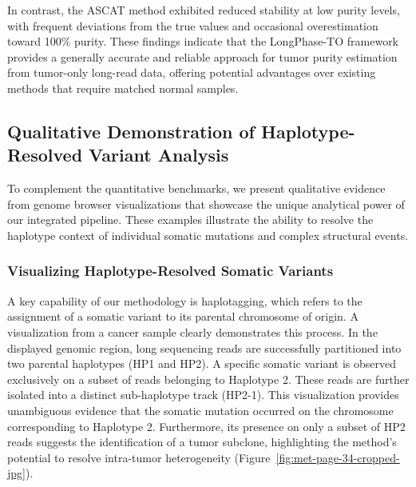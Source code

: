 \documentclass[pdflatex,sn-nature]{sn-jnl}
\begin{document}
In contrast, the ASCAT method exhibited reduced stability at low purity levels, with frequent deviations from the true values and occasional overestimation toward 100\% purity. These findings indicate that the LongPhase-TO framework provides a generally accurate and reliable approach for tumor purity estimation from tumor-only long-read data, offering potential advantages over existing methods that require matched normal samples.

\subsection{Qualitative Demonstration of Haplotype-Resolved Variant Analysis}\label{qualitative-demonstration-of-haplotype-resolved-variant-analysis}

To complement the quantitative benchmarks, we present qualitative evidence from genome browser visualizations that showcase the unique analytical power of our integrated pipeline. These examples illustrate the ability to resolve the haplotype context of individual somatic mutations and complex structural events.

\subsubsection{Visualizing Haplotype-Resolved Somatic Variants}\label{visualizing-haplotype-resolved-somatic-variants}

A key capability of our methodology is haplotagging, which refers to the assignment of a somatic variant to its parental chromosome of origin. A visualization from a cancer sample clearly demonstrates this process. In the displayed genomic region, long sequencing reads are successfully partitioned into two parental haplotypes (HP1 and HP2). A specific somatic variant is observed exclusively on a subset of reads belonging to Haplotype 2. These reads are further isolated into a distinct sub-haplotype track (HP2-1). This visualization provides unambiguous evidence that the somatic mutation occurred on the chromosome corresponding to Haplotype 2. Furthermore, its presence on only a subset of HP2 reads suggests the identification of a tumor subclone, highlighting the method's potential to resolve intra-tumor heterogeneity (Figure~\ref{fig:met-page-34-cropped-jpg}).
\end{document}
